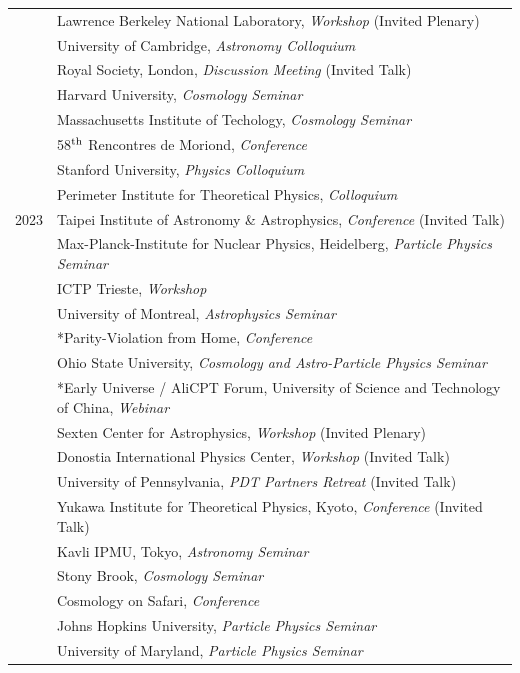 \begin{tabular}{l @{\hspace{4ex}} l}
& Lawrence Berkeley National Laboratory, \textit{Workshop} (Invited Plenary)\\
& University of Cambridge, \textit{Astronomy Colloquium}\\
& Royal Society, London, \textit{Discussion Meeting} (Invited Talk)\\
& Harvard University, \textit{Cosmology Seminar}\\
& Massachusetts Institute of Techology, \textit{Cosmology Seminar}\\
& 58$^{\rm th}$ Rencontres de Moriond, \textit{Conference}\\
& Stanford University, \textit{Physics Colloquium}\\
& Perimeter Institute for Theoretical Physics, \textit{Colloquium}\smallskip\\
2023 
& Taipei Institute of Astronomy \& Astrophysics, \textit{Conference} (Invited Talk)\\
& Max-Planck-Institute for Nuclear Physics, Heidelberg, \textit{Particle Physics Seminar}\\
& ICTP Trieste, \textit{Workshop}\\ & University of Montreal, \textit{Astrophysics Seminar}\\
& *Parity-Violation from Home, \textit{Conference}\\
& Ohio State University, \textit{Cosmology and Astro-Particle Physics Seminar}\\
& *Early Universe / AliCPT Forum, University of Science and Technology of China, \textit{Webinar}\\
& Sexten Center for Astrophysics, \textit{Workshop} (Invited Plenary)\\
& Donostia International Physics Center, \textit{Workshop} (Invited Talk)\\
& University of Pennsylvania, \textit{PDT Partners Retreat} (Invited Talk)\\
& Yukawa Institute for Theoretical Physics, Kyoto, \textit{Conference} (Invited Talk)\\
& Kavli IPMU, Tokyo, \textit{Astronomy Seminar}\\
& Stony Brook, \textit{Cosmology Seminar}\\
& Cosmology on Safari, \textit{Conference}\\
& Johns Hopkins University, \textit{Particle Physics Seminar}\\
& University of Maryland, \textit{Particle Physics Seminar}\\

\end{tabular}
